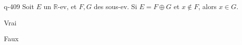 \begin{truefalse}{q-409}
Soit $E$ un $\mathbb R$-ev, et $F,G$ des sous-ev. Si $E=F \oplus G$ et $x\not\in F$, alors $x\in G$.
\item Vrai
\item* Faux
\end{truefalse}

